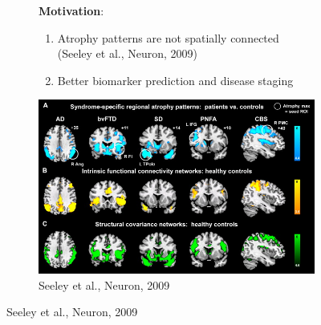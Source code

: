 \documentclass[10pt,xcolor=table]{beamer}
\begin{document}
\begin{frame}

\begin{figure}
\begin{subfigure}{0.48\textwidth}
\textbf{Motivation}:
\begin{enumerate}
\item Atrophy patterns are not spatially connected (Seeley et al., Neuron, 2009)
\vspace{2em}
\item Better biomarker prediction and disease staging
\end{enumerate}
\end{subfigure}
\begin{subfigure}{0.5\textwidth}
\centering 
\includegraphics[width=\textwidth, trim=0 85 0 0, clip]{seeley_connectivity_overlap.jpg}
\caption{Seeley et al., Neuron, 2009}
\end{subfigure}

\end{figure}

\vfill

\vspace{-3em}


\end{frame}
\end{document}
